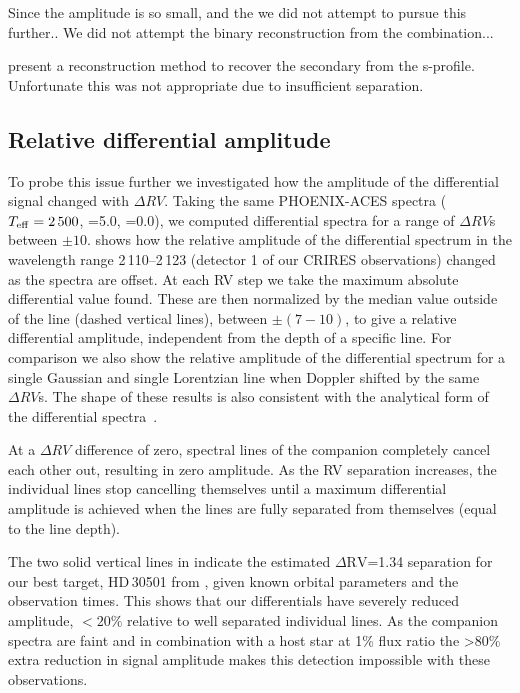Since the amplitude is so small, and the we did not attempt to pursue this further..
We did not attempt the binary reconstruction from the combination...

\citet{ferluga_separating_1997} present a reconstruction method to recover the secondary from the s-profile. Unfortunate this was not appropriate due to insufficient separation.


\subsection{Relative differential amplitude}
To probe this issue further we investigated how the amplitude of the differential signal changed with \(\Delta {RV}\). Taking the same {PHOENIX-ACES} spectra (\(T_{\mathrm{eff}}{}=2\,500\)\K{}, \logg{}=5.0, \feh{}=0.0), we computed differential spectra for a range of \(\Delta {RV}\)s between \(\pm10\)\kmps{}.  shows how the relative amplitude of the differential spectrum in the wavelength range 2\,110--2\,123\nm{} (detector 1 of our {CRIRES} observations) changed as the spectra are offset. At each {RV} step we take the maximum absolute differential value found. These are then normalized by the median value outside of the line {\fwhm} (dashed vertical lines), between \(\pm(7-10)\)\kmps{}, to give a relative differential amplitude, independent from the depth of a specific line. For comparison we also show the relative amplitude of the differential spectrum for a single Gaussian and single Lorentzian line when Doppler shifted by the same \(\Delta {RV}\)s. The shape of these results is also consistent with the analytical form of the differential spectra~\citet[][eqn.~A.1]{ferluga_separating_1997}.

At a \(\Delta {RV}\) difference of zero, spectral lines of the companion completely cancel each other out, resulting in zero amplitude. As the {RV} separation increases, the individual lines stop cancelling themselves until a maximum differential amplitude is achieved when the lines are fully separated from themselves (equal to the line depth).

The two solid vertical lines in  indicate the estimated \(\Delta \textrm{RV}\)=1.34\kmps{} separation for our best target, {HD\,30501} from , given known orbital parameters and the observation times. This shows that our differentials have severely reduced amplitude, \(<20\%\) relative to well separated individual lines. As the companion spectra are faint and in combination with a host star at 1\% flux ratio the >80\% extra reduction in signal amplitude makes this detection impossible with these observations.

